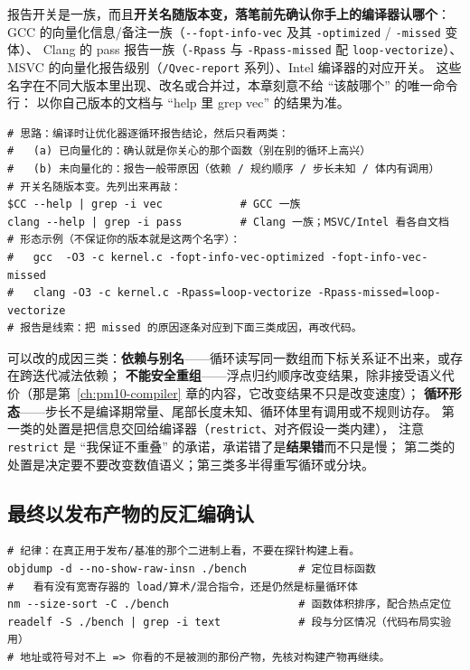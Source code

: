 \documentclass[12pt,a4paper,fontset=fandol]{ctexbook}
\newcommand{\Tp}[1]{\texttt{#1}}
\newcommand{\Opt}[1]{\texttt{-\/-#1}}
\newcommand{\Bk}{\discretionary{}{}{}}
\begin{document}
报告开关是一族，而且\textbf{开关名随版本变，落笔前先确认你手上的编译器认哪个}：
GCC 的向量化信息/备注一族（\Opt{fopt{\Bk}-info-vec} 及其 \Tp{-optimized} / \Tp{-missed} 变体）、
Clang 的 pass 报告一族（\Tp{-Rpass} 与 \Tp{-Rpass{\Bk}-missed} 配 \Tp{loop{\Bk}-vectorize}）、
MSVC 的向量化报告级别（\Tp{/Qvec-report} 系列）、Intel 编译器的对应开关。
这些名字在不同大版本里出现、改名或合并过，本章刻意不给 ``该敲哪个'' 的唯一命令行：
以你自己版本的文档与 ``help 里 grep vec'' 的结果为准。

\begin{lstlisting}[style=shellstyle,caption={向量化报告：先确认开关存在，再读结论},label={lst:pm06-vecreport}]
# 思路：编译时让优化器逐循环报告结论，然后只看两类：
#   (a) 已向量化的：确认就是你关心的那个函数（别在别的循环上高兴）
#   (b) 未向量化的：报告一般带原因（依赖 / 规约顺序 / 步长未知 / 体内有调用）
# 开关名随版本变。先列出来再敲：
$CC --help | grep -i vec            # GCC 一族
clang --help | grep -i pass         # Clang 一族；MSVC/Intel 看各自文档
# 形态示例（不保证你的版本就是这两个名字）：
#   gcc  -O3 -c kernel.c -fopt-info-vec-optimized -fopt-info-vec-missed
#   clang -O3 -c kernel.c -Rpass=loop-vectorize -Rpass-missed=loop-vectorize
# 报告是线索：把 missed 的原因逐条对应到下面三类成因，再改代码。
\end{lstlisting}

可以改的成因三类：\textbf{依赖与别名}——循环读写同一数组而下标关系证不出来，或存在跨迭代减法依赖；
\textbf{不能安全重组}——浮点归约顺序改变结果，除非接受语义代价（那是第~\ref{ch:pm10-compiler} 章的内容，它改变结果不只是改变速度）；
\textbf{循环形态}——步长不是编译期常量、尾部长度未知、循环体里有调用或不规则访存。
第一类的处置是把信息交回给编译器（\Tp{restrict}、对齐假设一类内建），
注意 \Tp{restrict} 是 ``我保证不重叠'' 的承诺，承诺错了是\textbf{结果错}而不只是慢；
第二类的处置是决定要不要改变数值语义；第三类多半得重写循环或分块。

\subsection{最终以发布产物的反汇编确认}

\begin{lstlisting}[style=shellstyle,caption={在发布产物上确认向量化与热区形态},label={lst:pm06-disasm}]
# 纪律：在真正用于发布/基准的那个二进制上看，不要在探针构建上看。
objdump -d --no-show-raw-insn ./bench        # 定位目标函数
#   看有没有宽寄存器的 load/算术/混合指令，还是仍然是标量循环体
nm --size-sort -C ./bench                    # 函数体积排序，配合热点定位
readelf -S ./bench | grep -i text            # 段与分区情况（代码布局实验用）
# 地址或符号对不上 => 你看的不是被测的那份产物，先核对构建产物再继续。
\end{lstlisting}
\end{document}
